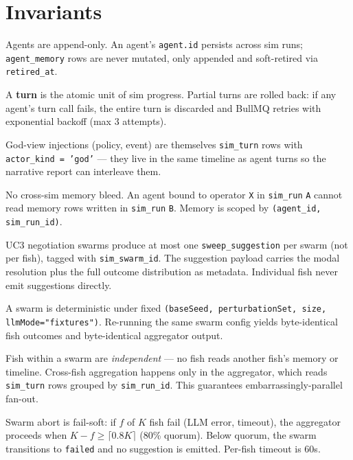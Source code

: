 \section{Invariants}
\begin{invariant}
Agents are append-only. An agent's \texttt{agent.id} persists across sim runs; \texttt{agent\_memory} rows are never mutated, only appended and soft-retired via \texttt{retired\_at}.
\end{invariant}
\begin{invariant}
A \textbf{turn} is the atomic unit of sim progress. Partial turns are rolled back: if any agent's turn call fails, the entire turn is discarded and BullMQ retries with exponential backoff (max 3 attempts).
\end{invariant}
\begin{invariant}
God-view injections (policy, event) are themselves \texttt{sim\_turn} rows with \texttt{actor\_kind = 'god'} --- they live in the same timeline as agent turns so the narrative report can interleave them.
\end{invariant}
\begin{invariant}
No cross-sim memory bleed. An agent bound to operator \texttt{X} in \texttt{sim\_run} \texttt{A} cannot read memory rows written in \texttt{sim\_run} \texttt{B}. Memory is scoped by \texttt{(agent\_id, sim\_run\_id)}.
\end{invariant}
\begin{invariant}
UC3 negotiation swarms produce at most one \texttt{sweep\_suggestion} per swarm (not per fish), tagged with \texttt{sim\_swarm\_id}. The suggestion payload carries the modal resolution plus the full outcome distribution as metadata. Individual fish never emit suggestions directly.
\end{invariant}
\begin{invariant}
A swarm is deterministic under fixed \texttt{(baseSeed, perturbationSet, size, llmMode="fixtures")}. Re-running the same swarm config yields byte-identical fish outcomes and byte-identical aggregator output.
\end{invariant}
\begin{invariant}
Fish within a swarm are \emph{independent} --- no fish reads another fish's memory or timeline. Cross-fish aggregation happens only in the aggregator, which reads \texttt{sim\_turn} rows grouped by \texttt{sim\_run\_id}. This guarantees embarrassingly-parallel fan-out.
\end{invariant}
\begin{invariant}
Swarm abort is fail-soft: if $f$ of $K$ fish fail (LLM error, timeout), the aggregator proceeds when $K - f \geq \lceil 0.8 K \rceil$ (80\% quorum). Below quorum, the swarm transitions to \texttt{failed} and no suggestion is emitted. Per-fish timeout is 60s.
\end{invariant}
